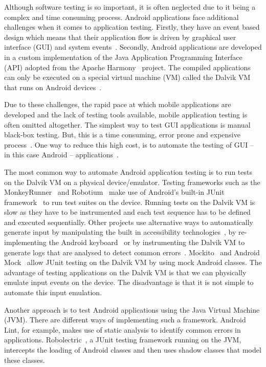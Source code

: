 \documentclass{acm_proc_article-sp}
\begin{document}
Although software testing is so important, it is often neglected due to it being a complex and time consuming process. Android
applications face additional challenges when it comes to application testing. Firstly, they have an event based design which means that
their application flow is driven by graphical user interface (GUI) and system events~\cite{Hu:2011}. Secondly, Android applications are
developed in a
custom implementation of the Java Application Programming Interface (API)  adopted from the Apache Harmony~\cite{harmony} project. The
compiled applications can only be executed on a special virtual machine (VM) called the Dalvik VM that runs on Android
devices~\cite{dalvik}.

Due to these challenges, the rapid pace at which mobile applications are developed and the lack of testing tools available, mobile
application testing is often omitted altogether. The simplest way to test GUI applications is manual black-box testing.
But, this is a time consuming, error prone and expensive process~\cite{AccessibilityTech}. One way to reduce this high cost, is to  automate
the testing of GUI -- in this case Android -- applications~\cite{AccessibilityTech}.

The most common way to automate Android application testing is to run tests on the Dalvik VM on a
physical device/emulator. Testing frameworks such as the MonkeyRunner~\cite{TestingAndroid} and Robotium~\cite{robotium} make use of Android's built-in JUnit
framework~\cite{TestingAndroid} to run test suites on the device. Running tests on the Dalvik VM is slow as they have to be instrumented and
each test sequence has to be defined and executed sequentially. Other projects use alternative ways to automatically generate input by
manipulating the built in accessibility technologies~\cite{AccessibilityTech}, by re-implementing the Android
keyboard~\cite{KeyboardModel} or by instrumenting the Dalvik VM to generate logs that are analysed to detect common errors~\cite{hu}. Mockito~\cite{mockito} and Android Mock~\cite{androidMock} allow JUnit testing on the Dalvik VM by using mock Android classes.  The advantage of
testing applications on the Dalvik VM is that we can physically emulate input events on the device. The disadvantage is that it is not
simple to automate this input emulation. 

Another approach is to test Android applications using the Java Virtual Machine (JVM). There are different ways of implementing such
a framework. Android Lint, for example, makes use of static analysis to identify common errors in applications.
Robolectric~\cite{robolectric}, a JUnit testing framework running on the JVM,  intercepts the loading of Android classes and then uses
shadow classes that model these classes.
\end{document}
